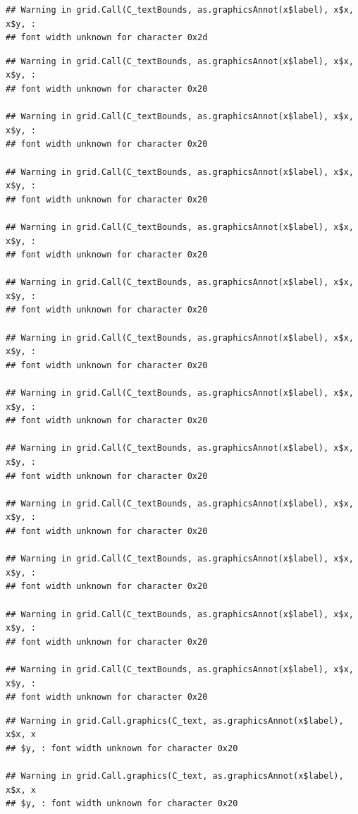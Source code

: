 \documentclass[]{article}
\theoremstyle{definition}
\theoremstyle{definition}
\theoremstyle{definition}
\theoremstyle{remark}
\begin{document}
\begin{verbatim}
## Warning in grid.Call(C_textBounds, as.graphicsAnnot(x$label), x$x, x$y, :
## font width unknown for character 0x2d
\end{verbatim}

\begin{verbatim}
## Warning in grid.Call(C_textBounds, as.graphicsAnnot(x$label), x$x, x$y, :
## font width unknown for character 0x20

## Warning in grid.Call(C_textBounds, as.graphicsAnnot(x$label), x$x, x$y, :
## font width unknown for character 0x20

## Warning in grid.Call(C_textBounds, as.graphicsAnnot(x$label), x$x, x$y, :
## font width unknown for character 0x20

## Warning in grid.Call(C_textBounds, as.graphicsAnnot(x$label), x$x, x$y, :
## font width unknown for character 0x20

## Warning in grid.Call(C_textBounds, as.graphicsAnnot(x$label), x$x, x$y, :
## font width unknown for character 0x20

## Warning in grid.Call(C_textBounds, as.graphicsAnnot(x$label), x$x, x$y, :
## font width unknown for character 0x20

## Warning in grid.Call(C_textBounds, as.graphicsAnnot(x$label), x$x, x$y, :
## font width unknown for character 0x20

## Warning in grid.Call(C_textBounds, as.graphicsAnnot(x$label), x$x, x$y, :
## font width unknown for character 0x20

## Warning in grid.Call(C_textBounds, as.graphicsAnnot(x$label), x$x, x$y, :
## font width unknown for character 0x20

## Warning in grid.Call(C_textBounds, as.graphicsAnnot(x$label), x$x, x$y, :
## font width unknown for character 0x20

## Warning in grid.Call(C_textBounds, as.graphicsAnnot(x$label), x$x, x$y, :
## font width unknown for character 0x20

## Warning in grid.Call(C_textBounds, as.graphicsAnnot(x$label), x$x, x$y, :
## font width unknown for character 0x20
\end{verbatim}

\begin{verbatim}
## Warning in grid.Call.graphics(C_text, as.graphicsAnnot(x$label), x$x, x
## $y, : font width unknown for character 0x20

## Warning in grid.Call.graphics(C_text, as.graphicsAnnot(x$label), x$x, x
## $y, : font width unknown for character 0x20
\end{verbatim}
\end{document}
